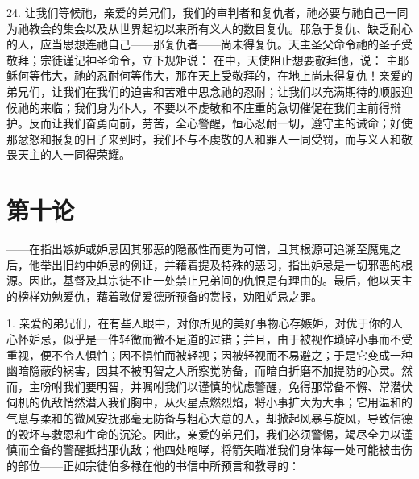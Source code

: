 24. 让我们等候祂，亲爱的弟兄们，我们的审判者和复仇者，祂必要与祂自己一同为祂教会的集会以及从世界起初以来所有义人的数目复仇。那急于复仇、缺乏耐心的人，应当思想连祂自己——那复仇者——尚未得复仇。天主圣父命令祂的圣子受敬拜；宗徒谨记神圣命令，立下规矩说：  在中，天使阻止想要敬拜他，说： 主耶稣何等伟大，祂的忍耐何等伟大，那在天上受敬拜的，在地上尚未得复仇！亲爱的弟兄们，让我们在我们的迫害和苦难中思念祂的忍耐；让我们以充满期待的顺服迎候祂的来临；我们身为仆人，不要以不虔敬和不庄重的急切催促在我们主前得辩护。反而让我们奋勇向前，劳苦，全心警醒，恒心忍耐一切，遵守主的诫命；好使那忿怒和报复的日子来到时，我们不与不虔敬的人和罪人一同受罚，而与义人和敬畏天主的人一同得荣耀。\par



\section{第十论}

\par

——在指出嫉妒或妒忌因其邪恶的隐蔽性而更为可憎，且其根源可追溯至魔鬼之后，他举出旧约中妒忌的例证，并藉着提及特殊的恶习，指出妒忌是一切邪恶的根源。因此，基督及其宗徒不止一处禁止兄弟间的仇恨是有理由的。最后，他以天主的榜样劝勉爱仇，藉着敦促爱德所预备的赏报，劝阻妒忌之罪。\par

1. 亲爱的弟兄们，在有些人眼中，对你所见的美好事物心存嫉妒，对优于你的人心怀妒忌，似乎是一件轻微而微不足道的过错；并且，由于被视作琐碎小事而不受重视，便不令人惧怕；因不惧怕而被轻视；因被轻视而不易避之；于是它变成一种幽暗隐蔽的祸害，因其不被明智之人所察觉防备，而暗自折磨不加提防的心灵。然而，主吩咐我们要明智，并嘱咐我们以谨慎的忧虑警醒，免得那常备不懈、常潜伏伺机的仇敌悄然潜入我们胸中，从火星点燃烈焰，将小事扩大为大事；它用温和的气息与柔和的微风安抚那毫无防备与粗心大意的人，却掀起风暴与旋风，导致信德的毁坏与救恩和生命的沉沦。因此，亲爱的弟兄们，我们必须警惕，竭尽全力以谨慎而全备的警醒抵挡那仇敌；他四处咆哮，将箭矢瞄准我们身体每一处可能被击伤的部位——正如宗徒伯多禄在他的书信中所预言和教导的：\par


